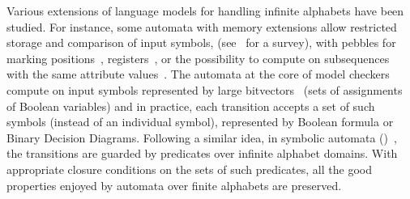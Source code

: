 Various extensions of language models for handling infinite alphabets have been studied.
For instance, some automata with memory extensions 
allow restricted storage and comparison of input symbols, 
(see~\cite{Segoufin06csl} for a survey),
with pebbles for marking positions~\cite{NevenSchwentickVianu04FSMinfinite}, 
registers~\cite{KaminskiFrancez94}, 
or %
the possibility to compute on subsequences 
with the same attribute values~\cite{Bojanczyk11FO2}. %
%
%
The automata at the core of model checkers
compute on input symbols represented by large bitvectors~\cite{Vardi07ciaa} %
(sets of assignments of Boolean variables) %
and in practice,  %
each transition accepts a set of such symbols (instead of an individual symbol), 
represented by Boolean formula or Binary Decision Diagrams.
%
Following a similar idea, %
in symbolic automata (\SA)~\cite{dAntoniVeanes17CAV,dAntoni21CACM}, 
the transitions are guarded by predicates over infinite alphabet domains.
With appropriate closure conditions on the sets of such predicates, %
all the good properties enjoyed by automata over finite alphabets are preserved.

